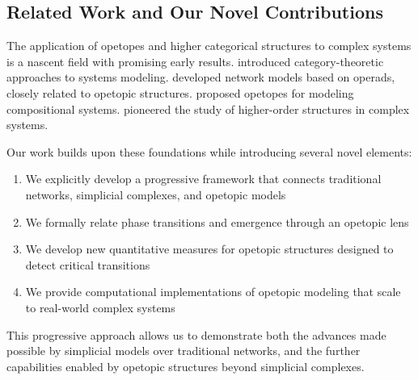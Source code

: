 \subsection{Related Work and Our Novel Contributions}
The application of opetopes and higher categorical structures to complex systems is a nascent field with promising early results. \citet{spivak2013categorical} introduced category-theoretic approaches to systems modeling. \citet{baez2020network} developed network models based on operads, closely related to opetopic structures. \citet{weinstein2023opetopes} proposed opetopes for modeling compositional systems. \citet{baas2009higher} pioneered the study of higher-order structures in complex systems.

Our work builds upon these foundations while introducing several novel elements:

\begin{enumerate}
    \item We explicitly develop a progressive framework that connects traditional networks, simplicial complexes, and opetopic models
    \item We formally relate phase transitions and emergence through an opetopic lens
    \item We develop new quantitative measures for opetopic structures designed to detect critical transitions
    \item We provide computational implementations of opetopic modeling that scale to real-world complex systems
\end{enumerate}

This progressive approach allows us to demonstrate both the advances made possible by simplicial models over traditional networks, and the further capabilities enabled by opetopic structures beyond simplicial complexes.